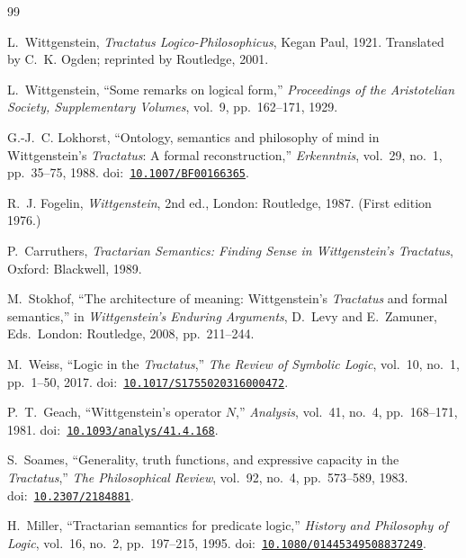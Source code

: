 \documentclass[10pt, letterpaper]{article}
\theoremstyle{definition}
\theoremstyle{remark}
\begin{document}
\begin{thebibliography}{99}

L.~Wittgenstein,
\emph{Tractatus Logico-Philosophicus},
Kegan Paul, 1921.
Translated by C.~K. Ogden; reprinted by Routledge, 2001.

L.~Wittgenstein,
``Some remarks on logical form,''
\emph{Proceedings of the Aristotelian Society, Supplementary
Volumes}, vol.~9, pp.~162--171, 1929.

G.-J.~C. Lokhorst,
``Ontology, semantics and philosophy of mind in Wittgenstein's
\emph{Tractatus}: A formal reconstruction,''
\emph{Erkenntnis}, vol.~29, no.~1, pp.~35--75, 1988.
\newline doi:~\href{https://doi.org/10.1007/BF00166365}{\texttt{10.1007/BF00166365}}.

R.~J. Fogelin,
\emph{Wittgenstein}, 2nd ed.,
London: Routledge, 1987.
(First edition 1976.)

P.~Carruthers,
\emph{Tractarian Semantics: Finding Sense in Wittgenstein's
\emph{Tractatus}},
Oxford: Blackwell, 1989.

M.~Stokhof,
``The architecture of meaning: Wittgenstein's \emph{Tractatus} and
formal semantics,''
in \emph{Wittgenstein's Enduring Arguments},
D.~Levy and E.~Zamuner, Eds.\
London: Routledge, 2008, pp.~211--244.

M.~Weiss,
``Logic in the \emph{Tractatus},''
\emph{The Review of Symbolic Logic}, vol.~10, no.~1,
pp.~1--50, 2017.
\newline doi:~\href{https://doi.org/10.1017/S1755020316000472}{\texttt{10.1017/S1755020316000472}}.

P.~T.~Geach,
``Wittgenstein's operator $N$,''
\emph{Analysis}, vol.~41, no.~4, pp.~168--171, 1981.
\newline doi:~\href{https://doi.org/10.1093/analys/41.4.168}{\texttt{10.1093/analys/41.4.168}}.

S.~Soames,
``Generality, truth functions, and expressive capacity in the
\emph{Tractatus},''
\emph{The Philosophical Review}, vol.~92, no.~4, pp.~573--589, 1983.
\newline doi:~\href{https://doi.org/10.2307/2184881}{\texttt{10.2307/2184881}}.

H.~Miller,
``Tractarian semantics for predicate logic,''
\emph{History and Philosophy of Logic}, vol.~16, no.~2,
pp.~197--215, 1995.
\newline doi:~\href{https://doi.org/10.1080/01445349508837249}{\texttt{10.1080/01445349508837249}}.


\end{thebibliography}
\end{document}
